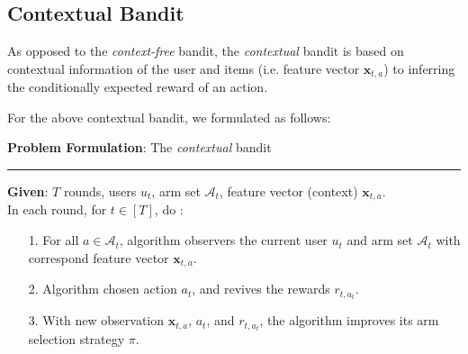 \subsection{Contextual Bandit}
As opposed to the \textit{context-free} bandit, the \textit{contextual} bandit is based on contextual information of the user and items (i.e. feature vector $\mathbf{x}_{t, a}$) to inferring the conditionally expected reward of an action.

For the above contextual bandit, we formulated as follows:
\begin{framed} 
\textbf{Problem Formulation}: The  \textit{contextual} bandit\\
\rule{\textwidth}{0.1mm}
\textbf{Given}: $T$ rounds, users $u_{t}$, arm set $\mathcal{A}_{t}$, feature vector (context) $\mathbf{x}_{t, a}$.\\
In each round, for $t\in [T]$, do :
\begin{itemize}
    \item [1.] For all $a \in \mathcal{A}_{t}$, algorithm observers the current user $u_{t}$ and arm set $\mathcal{A}_{t}$ with correspond feature vector $\mathbf{x}_{t, a}$.
    \item[2.] Algorithm chosen action $a_{t}$, and revives the rewards $r_{t,a_{t}}$.
    \item[3.] With new observation $\mathbf{x}_{t, a}$, $a_{t}$, and $r_{t,a_{t}}$, the algorithm improves its arm selection strategy $\pi$.
\end{itemize}
\end{framed} 

